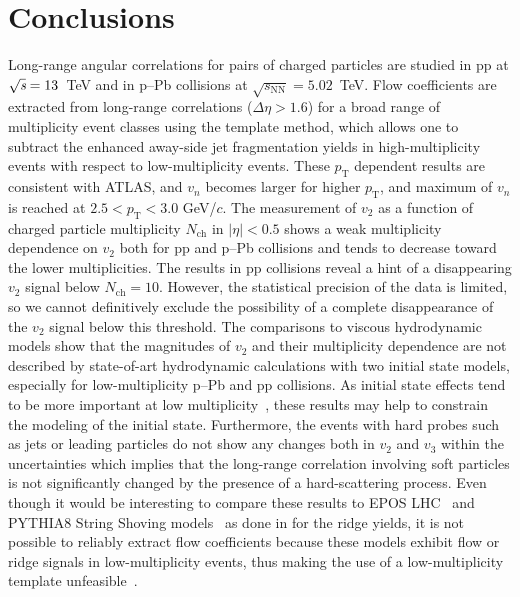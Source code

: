 
\section{Conclusions}
\label{sec:summary}
Long-range angular correlations for pairs of charged particles are studied in pp at ${\sqrt{{\textit s}}}=13$~TeV and in p--Pb collisions at $\sqrt{s_\mathrm{NN}} = 5.02$~TeV. Flow coefficients are extracted from long-range correlations ($\Delta\eta > 1.6$) for a broad range of multiplicity event classes using the template  method, which allows one to subtract the enhanced away-side jet fragmentation yields in high-multiplicity events with respect to low-multiplicity events.
These $p_\mathrm{T}$ dependent results are consistent with ATLAS, and $v_n$ becomes larger for higher $p_\mathrm{T}$, and maximum of $v_n$ is reached at $2.5<p_\mathrm{T}<3.0$ GeV/$c$. 
The measurement of $v_2$ as a function of charged particle multiplicity $N_{\mathrm{ch}}$ in $|\eta|<0.5$ shows a weak multiplicity dependence on $v_2$ both for pp and p--Pb collisions and tends to decrease toward the lower multiplicities. The results in pp collisions reveal a hint of a disappearing $v_2$ signal below $N_{\mathrm{ch}} = 10$. However, the statistical precision of the data is limited, so we cannot definitively exclude the possibility of a complete disappearance of the $v_2$ signal below this threshold. 
The comparisons to viscous hydrodynamic models show that the magnitudes of $v_2$ and their multiplicity dependence are not described by state-of-art hydrodynamic calculations with two initial state models, especially for low-multiplicity p--Pb and pp collisions. As initial state effects tend to be more important at low multiplicity~\cite{Greif:2017bnr,Moreland:2018gsh}, these results may help to constrain the modeling of the initial state.
Furthermore, the events with hard probes such as jets or leading particles do not show any changes both in $v_2$ and $v_3$ within the uncertainties which implies that the long-range correlation involving soft particles is not significantly changed by the presence of a hard-scattering process. 
Even though it would be interesting to compare these results to EPOS LHC~\cite{Pierog:2013ria} and PYTHIA8 String Shoving models~\cite{Bierlich:2017vhg,Bierlich:2019ixq} as done in \cite{ALICE:2012eyl} for the ridge yields, it is not possible to reliably extract flow coefficients because these models exhibit flow or ridge signals in low-multiplicity events, thus making the use of a low-multiplicity template unfeasible~\cite{Ji:2023eqn}.

